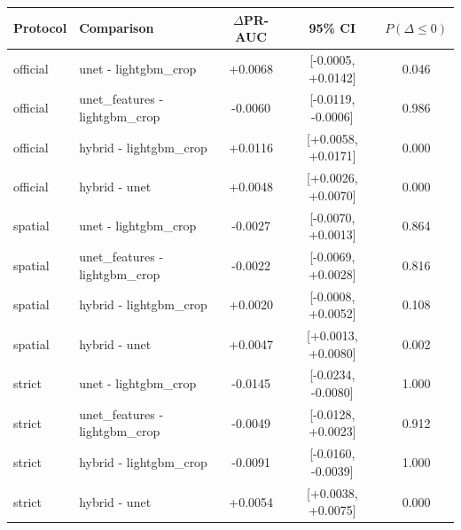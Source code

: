 \begin{tabular}{llccc}
\toprule
Protocol & Comparison & $\Delta$PR-AUC & 95\% CI & $P(\Delta \le 0)$ \\
\midrule
official & unet - lightgbm\_crop & +0.0068 & [-0.0005, +0.0142] & 0.046 \\
official & unet\_features - lightgbm\_crop & -0.0060 & [-0.0119, -0.0006] & 0.986 \\
official & hybrid - lightgbm\_crop & +0.0116 & [+0.0058, +0.0171] & 0.000 \\
official & hybrid - unet & +0.0048 & [+0.0026, +0.0070] & 0.000 \\
\midrule
spatial & unet - lightgbm\_crop & -0.0027 & [-0.0070, +0.0013] & 0.864 \\
spatial & unet\_features - lightgbm\_crop & -0.0022 & [-0.0069, +0.0028] & 0.816 \\
spatial & hybrid - lightgbm\_crop & +0.0020 & [-0.0008, +0.0052] & 0.108 \\
spatial & hybrid - unet & +0.0047 & [+0.0013, +0.0080] & 0.002 \\
\midrule
strict & unet - lightgbm\_crop & -0.0145 & [-0.0234, -0.0080] & 1.000 \\
strict & unet\_features - lightgbm\_crop & -0.0049 & [-0.0128, +0.0023] & 0.912 \\
strict & hybrid - lightgbm\_crop & -0.0091 & [-0.0160, -0.0039] & 1.000 \\
strict & hybrid - unet & +0.0054 & [+0.0038, +0.0075] & 0.000 \\
\bottomrule
\end{tabular}
